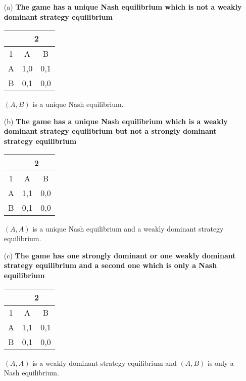 \documentclass[12pt, a4paper]{article}
\begin{document}
	\begin{enumerate}
		\item[(a)] \textbf{The game has a unique Nash equilibrium which is not a weakly dominant strategy equilibrium}
		
		\begin{table}[ht!]
			\centering
			\begin{tabular}{|c|c|c|} \hline
				& \multicolumn{2}{|c|}{2} \\ \hline
				1 & A & B \\ \hline
				A & 1,0 & 0,1 \\ \hline
				B & 0,1 & 0,0 \\ \hline
			\end{tabular}
		\end{table}
		
		$(A,B)$ is a unique Nash equilibrium.
		
		\item[(b)] \textbf{The game has a unique Nash equilibrium which is a weakly dominant strategy equilibrium but not a strongly dominant strategy equilibrium}
		
		\begin{table}[ht!]
			\centering
			\begin{tabular}{|c|c|c|} \hline
				& \multicolumn{2}{|c|}{2} \\ \hline
				1 & A & B \\ \hline
				A & 1,1 & 0,0 \\ \hline
				B & 0,1 & 0,0 \\ \hline
			\end{tabular}
		\end{table}
		
		$(A,A)$ is a unique Nash equilibrium and a weakly dominant strategy equilibrium.
		
		\item[(c)] \textbf{The game has one strongly dominant or one weakly dominant strategy equilibrium and a second one which is only a Nash equilibrium}
		
		\begin{table}[ht!]
			\centering
			\begin{tabular}{|c|c|c|} \hline
				& \multicolumn{2}{|c|}{2} \\ \hline
				1 & A & B \\ \hline
				A & 1,1 & 0,1 \\ \hline
				B & 0,1 & 0,0 \\ \hline
			\end{tabular}
		\end{table}
		
		$(A,A)$ is a weakly dominant strategy equilibrium and $(A,B)$ is only a Nash equilibrium.
		
	\end{enumerate}
	
\end{document}
